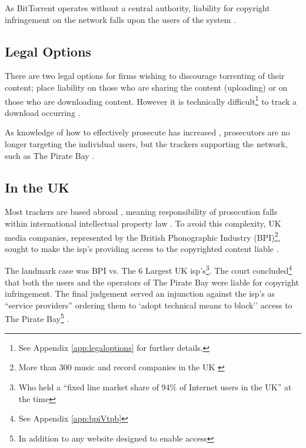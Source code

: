 As BitTorrent operates without a central authority, liability for copyright infringement on the network falls upon the users of the system \citep{currentstateofbittorrent}.

\subsection{Legal Options}
There are two legal options for firms wishing to discourage torrenting of their content; place liability on those who are sharing the content (uploading) or on those who are downloading content.
%
However it is technically difficult\footnote{See Appendix \ref{app:legaloptions} for further details.} to track a download occurring \citep{MDE:MDE2634}.

As knowledge of how to effectively prosecute has increased \citep{currentstateofbittorrent}, prosecutors are no longer targeting the individual users, but the \glspl{tracker} supporting the network, such as The Pirate Bay \citep[p.179 - 181]{fungvsmpaa, intellectualproperty}.

\subsection{In the UK}

Most trackers are based abroad \citep{top10trackers2014}, meaning responsibility of prosecution falls within international intellectual property law \citep[III.]{currentstateofbittorrent}.
%
To avoid this complexity, UK media companies, represented by the British Phonographic Industry (BPI)\footnote{More than 300 music and record companies in the UK \citep{bpi2013}}, sought to make the \gls{isp}'s providing access to the copyrighted content liable \citep{bpivsukisps, meale2013triple}.

The landmark case was BPI vs. The 6 Largest UK \gls{isp}'s\footnote{Who held a ``fixed line market share of 94\% of Internet users in the UK'' at the time}. The court concluded\footnote{See Appendix \ref{app:bpiVtpb}} that both the users and the operators of The Pirate Bay were liable for copyright infringement.
%
The final judgement served an injunction against the \gls{isp}'s as ``service providers'' \citep[97A]{cdpa} ordering them to `adopt technical means to block'' access to The Pirate Bay\footnote{In addition to any website designed to enable access} \citep{bpivsukisps, meale2013triple}.

